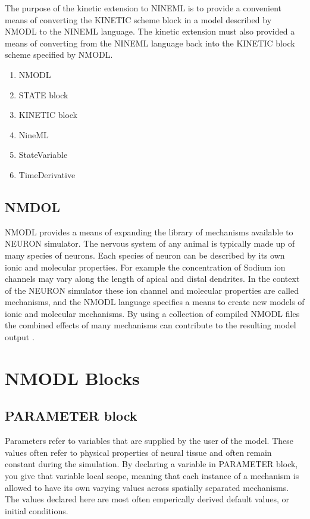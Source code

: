 \documentclass[draftspec]{ninemlspec}
\begin{document}
The purpose of the kinetic extension to NINEML is to provide a convenient means of converting the KINETIC scheme block in a model described by NMODL to the NINEML language. The kinetic extension must also provided a means of converting from the NINEML language back into the KINETIC block scheme specified by NMODL.

\begin{enumerate}
\item NMODL
\item STATE block
\item KINETIC block
\item NineML
\item StateVariable
\item TimeDerivative
\end{enumerate}




\subsection{NMDOL}
NMODL provides a means of expanding the library of mechanisms available to NEURON simulator. The nervous system of any animal is typically made up of many species of neurons. Each species of neuron can be described by its own ionic and molecular properties. For example the concentration of Sodium ion channels may vary along the length of apical and distal dendrites. In the context of the NEURON simulator these ion channel and molecular properties are called mechanisms, and the NMODL language specifies a means to create new models of ionic and molecular mechanisms. By using a collection of compiled NMODL files the combined effects of many mechanisms can contribute to the resulting model output \cite{carnevale2006neuron}. 

\section{NMODL Blocks}

\subsection{PARAMETER block}

Parameters refer to variables that are supplied by the user of the model. These values often refer to physical properties of neural tissue and often remain constant during the simulation.  By declaring a variable in PARAMETER block, you give that variable local scope, meaning that each instance of a mechanism is allowed to have its own varying values across spatially separated mechanisms. The values declared here are most often emperically derived default values, or initial conditions.
\end{document}
